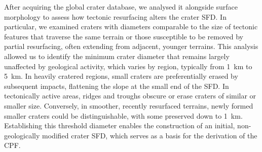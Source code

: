 \documentclass[preprint,11pt,3p,times,authoryear]{elsarticle}
\begin{document}
{After acquiring the global crater database, we analysed it alongside surface morphology to assess how tectonic resurfacing alters the crater SFD. In particular, we examined craters with diameters comparable to the size of tectonic features that traverse the same terrain or those susceptible to be removed by partial resurfacing, often extending from adjacent, younger terrains. This analysis allowed us to identify the minimum crater diameter that remains largely unaffected by geological activity, which varies by region, typically from 1~km to 5~km. In heavily cratered regions, small craters are preferentially erased by subsequent impacts, flattening the slope at the small end of the SFD. In tectonically active areas, ridges and troughs obscure or erase craters of similar or smaller size. Conversely, in smoother, recently resurfaced terrains, newly formed smaller craters could be distinguishable, with some preserved down to 1~km. Establishing this threshold diameter enables the construction of an initial, non-geologically modified crater SFD, which serves as a basis for the derivation of the CPF.\\

}
\end{document}
